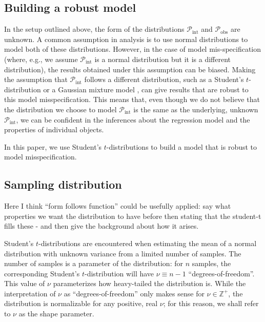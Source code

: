 \documentclass[fleqn,usenatbib]{rasti}
\begin{document}
\subsection{Building a robust model}
\label{sec:formalism.robust}

In the setup outlined above, the form of the distributions
$\mathcal{P}_{\text{int}}$ and
$\mathcal{P}_{\text{obs}}$ are unknown. A common
assumption in analysis is to use normal distributions to model both of these
distributions. However, in the case of model mis-specification (where, e.g., we
assume $\mathcal{P}_{\text{int}}$ is a normal distribution but it is a different
distribution), the results obtained under this assumption can be biased.
Making the assumption that $\mathcal{P}_{\text{int}}$ follows a different
distribution, such as a Student's $t$-distribution \citep{Andrews:1974} or a Gaussian
mixture model \citep{Aitkin:1980}, can give results that are robust to this model
misspecification. This means that, even though we do not believe that the
distribution we choose to model $\mathcal{P}_{\text{int}}$ is the same as the
underlying, unknown $\mathcal{P}_{\text{int}}$, we can be confident in the
inferences about the regression model and the properties of individual objects.

In this paper, we use Student's $t$-distributions to build a model that is
robust to model misspecification.

\subsection{Sampling distribution}
\label{sec:formalism.sampling}

{\color{green} Here I think ``form follows function'' could be usefully applied: say what properties we want the distribution to have before then stating that the student-t fills these - and then give the background about how it arises.}

Student's $t$-distributions are encountered when estimating the mean of a normal
distribution with unknown variance from a limited number of samples. The number
of samples is a parameter of the distribution: for $n$ samples, the
corresponding Student's $t$-distribution will have $\nu \equiv n - 1$
``degrees-of-freedom''. This value of $\nu$ parameterizes how heavy-tailed the
distribution is. While the interpretation of $\nu$ as ``degrees-of-freedom''
only makes sense for $\nu \in \mathbb Z^+$, the distribution is normalizable for
any positive, real $\nu$; for this reason, we shall refer to $\nu$ as the shape
parameter.
\end{document}
